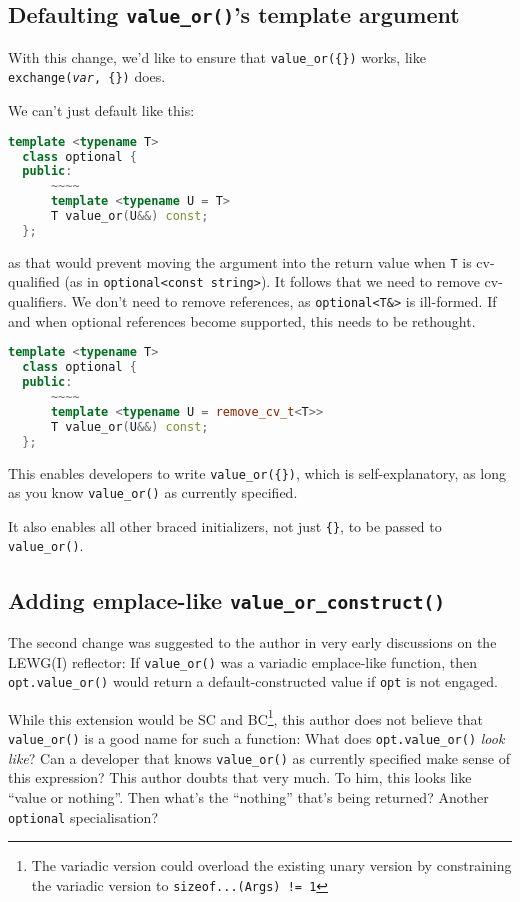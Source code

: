 \documentclass[11pt]{article}
\begin{document}
\subsection{Defaulting \texttt{value\_or()}'s template argument}
\label{sec:defaulting}

With this change, we'd like to ensure that \texttt{value\_or(\{\})}
works, like \texttt{exchange(\textit{var}, \{\})} does.

We can't just default like this:

\begin{lstlisting}[language=c++]
  template <typename T>
  class optional {
  public:
      ~~~~
      template <typename U = T>
      T value_or(U&&) const;
  };
\end{lstlisting}

as that would prevent moving the argument into the return value when
\texttt{T} is cv-qualified (as in \texttt{optional<const string>}). It
follows that we need to remove cv-qualifiers. We don't need to remove
references, as \texttt{optional<T\&>} is ill-formed. If and when
optional references become supported, this needs to be rethought.

\begin{lstlisting}[language=c++]
  template <typename T>
  class optional {
  public:
      ~~~~
      template <typename U = remove_cv_t<T>>
      T value_or(U&&) const;
  };
\end{lstlisting}

This enables developers to write \texttt{value\_or(\{\})}, which is
self-explanatory, as long as you know \texttt{value\_or()} as
currently specified.

It also enables all other braced initializers, not just \texttt{\{\}},
to be passed to \texttt{value\_or()}.

\subsection{Adding emplace-like \texttt{value\_or\_construct()}}
\label{sec:emplace}

The second change was suggested to the author in very early
discussions on the LEWG(I) reflector: If \texttt{value\_or()} was a
variadic emplace-like function, then \texttt{opt.value\_or()} would
return a default-constructed value if \texttt{opt} is not engaged.

While this extension would be SC and BC\footnote{The variadic version
  could overload the existing unary version by constraining the
  variadic version to \texttt{sizeof...(Args) != 1}}, this author does
not believe that \texttt{value\_or()} is a good name for such a
function: What does \texttt{opt.value\_or()} \emph{look like}? Can a
developer that knows \texttt{value\_or()} as currently specified make
sense of this expression? This author doubts that very much. To him,
this looks like ``value or nothing''. Then what's the ``nothing''
that's being returned?  Another \texttt{optional} specialisation?
\end{document}
